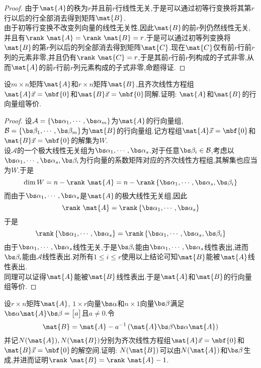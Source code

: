 \documentclass{ctexart}
\begin{document}
\begin{proof}
    由于$\mat{A}$的秩为$r$并且前$r$行线性无关,于是可以通过初等行变换将其第$r$行以后的行全部消去得到矩阵$\mat{B}$.\\
    由于初等行变换不改变列向量的线性无关性,因此$\mat{B}$的前$r$列仍然线性无关,并且有$\rank\ \mat{A}=\rank\ \mat{B}=r$.于是可以通过初等列变换将$\mat{B}$的第$r$列以后的列全部消去得到矩阵$\mat{C}$.现在$\mat{C}$仅有前$r$行前$r$列的元素非零,并且仍有$\rank\ \mat{C}=r$,于是其前$r$行前$r$列构成的子式非零,从而$\mat{A}$的前$r$行前$r$列元素构成的子式非零,命题得证.
\end{proof}
\begin{homework}[6(10')]
    设$m\times n$矩阵$\mat{A}$和$r\times n$矩阵$\mat{B}$,且齐次线性方程组$\mat{A}\vec{x}=\mbf{0}$和$\mat{B}\vec{x}=\mbf{0}$同解.证明: $\mat{A}$和$\mat{B}$的行向量组等价.
\end{homework}
\begin{proof}
    设$\mathcal{A}=\left\{\bs\alpha_1,\cdots,\bs\alpha_m\right\}$为$\mat{A}$的行向量组, $\mathcal{B}=\left\{\bs\beta_1,\cdots,\bs\beta_m\right\}$为$\mat{B}$的行向量组.记方程组$\mat{A}\vec{x}=\mbf{0}$和$\mat{B}\vec{x}=\mbf{0}$的解集为$W$.\\
    设$\mathcal{A}$的一个极大线性无关组为$\bs\alpha_1,\cdots,\bs\alpha_s$.对于任意$\bs\beta_i\in\mathcal{B}$,考虑以$\bs\alpha_1,\cdots,\bs\alpha_s,\bs\beta_i$为行向量的系数矩阵对应的齐次线性方程组,其解集也应当为$W$.于是
    \[\dim W=n-\rank\ \mat{A}=n-\rank\left\{\bs\alpha_1,\cdots,\bs\alpha_s,\bs\beta_i\right\}\]
    而由于$\bs\alpha_1,\cdots,\bs\alpha_s$是$\mat{A}$的极大线性无关组,因此
    \[\rank\ \mat{A}=\rank\left\{\bs\alpha_1,\cdots,\bs\alpha_s\right\}\]
    于是
    \[\rank\left\{\bs\alpha_1,\cdots,\bs\alpha_s\right\}=\rank\left\{\bs\alpha_1,\cdots,\bs\alpha_s,\bs\beta_i\right\}\]
    由于$\bs\alpha_1,\cdots,\bs\alpha_s$线性无关,于是$\bs\beta_i$能由$\bs\alpha_1,\cdots,\bs\alpha_s$线性表出,进而$\bs\beta_i$能由$\mathcal{A}$线性表出.对所有$1\leqslant i\leqslant r$使用以上结论可知$\mat{B}$能被$\mat{A}$线性表出.\\
    同理可以证得$\mat{A}$能被$\mat{B}$线性表出.于是$\mat{A}$和$\mat{B}$的行向量组等价.
\end{proof}
\begin{homework}[7(12')]
    设$r\times n$矩阵$\mat{A}$, $1\times r$向量$\bs\alpha$和$n\times 1$向量$\bs\beta$满足$\bs\alpha\mat{A}\bs\beta=\begin{bmatrix}a\end{bmatrix}$且$a\neq0$.令
    \[\mat{B}=\mat{A}-a^{-1}\left(\mat{A}\bs\beta\bs\alpha\mat{A}\right)\]
    并记$N(\mat{A}),N(\mat{B})$分别为齐次线性方程组$\mat{A}\vec{x}=\mbf{0}$和$\mat{B}\vec{x}=\mbf{0}$的解空间.证明: $N(\mat{B})$可以由$N(\mat{A})$和$\bs\beta$生成,并进而证明$\rank\ \mat{B}=\rank\ \mat{A}-1$.
\end{homework}
\end{document}
